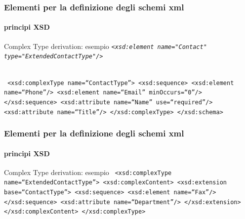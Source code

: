 %   
%  
%

\begin{frame}
	\frametitle{Elementi per la definizione degli schemi xml}
	\framesubtitle{principi XSD}
	\addtocounter{nframe}{1}

	\begin{block}{Complex Type derivation: esempio}
		\texttt{\emph{<xsd:element name="Contact" type="ExtendedContactType"/>}}

		\\\texttt{
			<xsd:complexType name=``ContactType''>
			<xsd:sequence>
			<xsd:element name=``Phone''/>
			<xsd:element name=``Email'' minOccurs=``0''/>
			</xsd:sequence>
			<xsd:attribute name=``Name'' use=``required''/>
			<xsd:attribute name=``Title''/>
			</xsd:complexType>
			</xsd:schema>
		}
	\end{block}
\end{frame}


\begin{frame}
	\frametitle{Elementi per la definizione degli schemi xml}
	\framesubtitle{principi XSD}
	\addtocounter{nframe}{1}

	\begin{block}{Complex Type derivation: esempio}
		\texttt{
			<xsd:complexType name=``ExtendedContactType''>
			<xsd:complexContent>
			<xsd:extension base=``ContactType''>
			<xsd:sequence>
			<xsd:element name=``Fax''/>
			</xsd:sequence>
			<xsd:attribute name=``Department''/>
			</xsd:extension>
			</xsd:complexContent>
			</xsd:complexType>
		}
	\end{block}
\end{frame}

